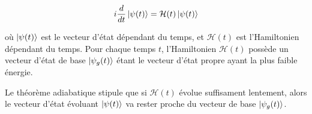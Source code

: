 \documentclass[12pt,a4paper]{article}
\begin{document}
\begin{equation}
    i \frac{d}{dt} \ket{\psi(t)} = \mathcal{H}(t) \ket{\psi(t)}
\end{equation}

où $\ket{\psi(t)}$ est le vecteur d'état dépendant du temps, et $\mathcal{H}(t)$ est l'Hamiltonien dépendant du temps. Pour chaque temps $t$, l'Hamiltonien $\mathcal{H}(t)$ possède un vecteur d'état de base $\ket{\psi_g (t)}$ étant le vecteur d'état propre ayant la plus faible énergie.

Le théorème adiabatique stipule que si $\mathcal{H}(t)$ évolue suffisament lentement, alors le vecteur d'état évoluant $\ket{\psi(t)}$ va rester proche du vecteur de base $\ket{\psi_g (t)}$.






\end{document}
